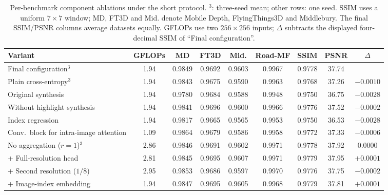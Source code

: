 \begin{table}[htbp]
\centering
\scriptsize
\setlength{\tabcolsep}{1.8pt}
\caption{Per-benchmark component ablations under the short protocol. $^3$: three-seed mean; other rows: one seed. SSIM uses a uniform $7\times7$ window; MD, FT3D and Mid. denote Mobile Depth, FlyingThings3D and Middlebury. The final SSIM/PSNR columns average datasets equally. GFLOPs use two $256\times256$ inputs; $\Delta$ subtracts the displayed four-decimal SSIM of ``Final configuration''.}
\label{tab:ablation_full}
\begin{tabular}{lcccccccc}
\toprule
Variant & GFLOPs & MD & FT3D & Mid. & Road-MF & SSIM & PSNR & $\Delta$ \\
\midrule
Final configuration$^{3}$ & 1.94 & 0.9849 & 0.9692 & 0.9603 & 0.9967 & 0.9778 & 37.74 &  \\
\midrule
Plain cross-entropy$^{3}$ & 1.94 & 0.9843 & 0.9675 & 0.9590 & 0.9963 & 0.9768 & 37.26 & $-0.0010$ \\
Original synthesis & 1.94 & 0.9780 & 0.9684 & 0.9588 & 0.9948 & 0.9750 & 36.75 & $-0.0028$ \\
Without highlight synthesis & 1.94 & 0.9841 & 0.9696 & 0.9600 & 0.9966 & 0.9776 & 37.52 & $-0.0002$ \\
Index regression & 1.94 & 0.9817 & 0.9665 & 0.9565 & 0.9953 & 0.9750 & 36.53 & $-0.0028$ \\
Conv.\ block for intra-image attention & 1.09 & 0.9864 & 0.9679 & 0.9586 & 0.9958 & 0.9772 & 37.33 & $-0.0006$ \\
No aggregation ($r=1$)$^{3}$ & 2.86 & 0.9846 & 0.9691 & 0.9602 & 0.9971 & 0.9778 & 37.92 & 0.0000 \\
\midrule
+ Full-resolution head & 2.81 & 0.9845 & 0.9695 & 0.9607 & 0.9971 & 0.9779 & 37.95 & $+0.0001$ \\
+ Second resolution ($1/8$) & 2.95 & 0.9853 & 0.9686 & 0.9597 & 0.9970 & 0.9776 & 37.75 & $-0.0002$ \\
+ Image-index embedding & 1.94 & 0.9847 & 0.9695 & 0.9605 & 0.9968 & 0.9779 & 37.81 & $+0.0001$ \\
\bottomrule
\end{tabular}
\end{table}
